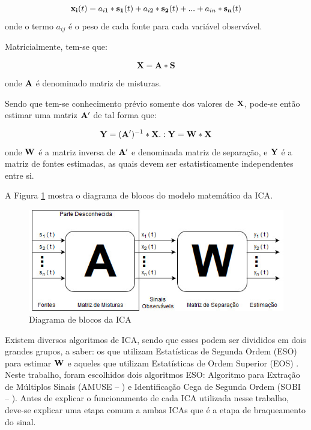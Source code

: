 \documentclass[a4paper,12pt]{monografia}
\theoremstyle{plain}
\theoremstyle{definition}
\theoremstyle{remark}
\begin{document}
\begin{equation}
    {\bf x_{i}} ( t ) = a_{i1} *{\bf s_{1} }( t ) + a_{i2} *{\bf s_{2}} ( t ) + ... + a_{in} *{\bf s_{n}} ( t )
    \label{eq:ICA1}
\end{equation}
onde o termo $a_{ij}$ é o peso de cada fonte para cada variável observável.

Matricialmente, tem-se que:

\begin{equation}
    {\bf X} = {\bf A} *  {\bf S}
    \label{eq:ICA2}
\end{equation}
onde ${\bf A}$ é denominado matriz de misturas.

Sendo que tem-se conhecimento prévio somente dos valores de ${\bf X}$, pode-se então estimar uma matriz ${\bf A'}$ de tal forma que:

\begin{equation}
    {\bf Y}=({\bf A'})^{-1}*{\bf X} .: {\bf Y} = {\bf W} *{\bf X} 
    \label{eq:ICA3}
\end{equation}
onde ${\bf W}$ é a matriz inversa de ${\bf A'}$ e denominada matriz de separação, e ${\bf Y}$ é a matriz de fontes estimadas, as quais devem ser estatisticamente independentes entre si.

A Figura \ref{fig:DigramaBSS} mostra o diagrama de blocos do modelo matemático da ICA.

\begin{figure}[!htb]
    \begin{center}
    \includegraphics[scale=0.7]{imagens/diagramaBSS.jpg}
    \caption{Diagrama de blocos da ICA}
    \label{fig:DigramaBSS}
    \end{center}
\end{figure}

Existem diversos algoritmos de ICA, sendo que esses podem ser divididos em dois grandes grupos, a saber: os que utilizam Estatísticas de Segunda Ordem (ESO) para estimar ${\bf W}$ e aqueles que utilizam Estatísticas de Ordem Superior (EOS) \cite{faier2011analise}.
Neste trabalho, foram escolhidos dois algoritmos ESO: Algoritmo para Extração de Múltiplos Sinais (AMUSE –  \cite{tong1990amuse})  e Identificação Cega de Segunda Ordem (SOBI –  \cite{belouchrani1993second}). Antes de explicar o funcionamento de cada ICA utilizada nesse trabalho, deve-se explicar uma etapa comum a ambas ICAs que é a etapa de braqueamento do sinal.
\end{document}
